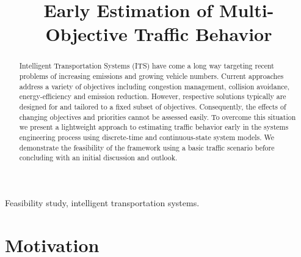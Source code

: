\documentclass[conference]{../cls/IEEEtran}
\begin{document}
\title{Early Estimation of Multi-Objective Traffic Behavior}

\author{
	\and
}

\maketitle

\begin{abstract}
Intelligent Transportation Systems (ITS) have come a long way targeting recent problems of increasing emissions and growing vehicle numbers. Current approaches address a variety of objectives including congestion management, collision avoidance, energy-efficiency and emission reduction. However, respective solutions typically are designed for and tailored to a fixed subset of objectives. Consequently, the effects of changing objectives and priorities cannot be assessed easily. To overcome this situation we present a lightweight approach to estimating traffic behavior early in the systems engineering process using discrete-time and continuous-state system models. We demonstrate the feasibility of the framework using a basic traffic scenario before concluding with an initial discussion and outlook.
\end{abstract}

\begin{IEEEkeywords}
Feasibility study, intelligent transportation systems.
\end{IEEEkeywords}

\section{Motivation}
\end{document}
